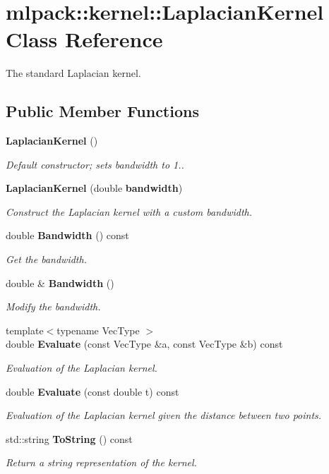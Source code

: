 \section{mlpack\-:\-:kernel\-:\-:Laplacian\-Kernel Class Reference}
\label{classmlpack_1_1kernel_1_1LaplacianKernel}


The standard Laplacian kernel.  


\subsection*{Public Member Functions}
\begin{DoxyCompactItemize}
\item 
{\bf Laplacian\-Kernel} ()
\begin{DoxyCompactList}\small\item\em Default constructor; sets bandwidth to 1.. \end{DoxyCompactList}\item 
{\bf Laplacian\-Kernel} (double {\bf bandwidth})
\begin{DoxyCompactList}\small\item\em Construct the Laplacian kernel with a custom bandwidth. \end{DoxyCompactList}\item 
double {\bf Bandwidth} () const 
\begin{DoxyCompactList}\small\item\em Get the bandwidth. \end{DoxyCompactList}\item 
double \& {\bf Bandwidth} ()
\begin{DoxyCompactList}\small\item\em Modify the bandwidth. \end{DoxyCompactList}\item 
{\footnotesize template$<$typename Vec\-Type $>$ }\\double {\bf Evaluate} (const Vec\-Type \&a, const Vec\-Type \&b) const 
\begin{DoxyCompactList}\small\item\em Evaluation of the Laplacian kernel. \end{DoxyCompactList}\item 
double {\bf Evaluate} (const double t) const 
\begin{DoxyCompactList}\small\item\em Evaluation of the Laplacian kernel given the distance between two points. \end{DoxyCompactList}\item 
std\-::string {\bf To\-String} () const 
\begin{DoxyCompactList}\small\item\em Return a string representation of the kernel. \end{DoxyCompactList}\end{DoxyCompactItemize}
